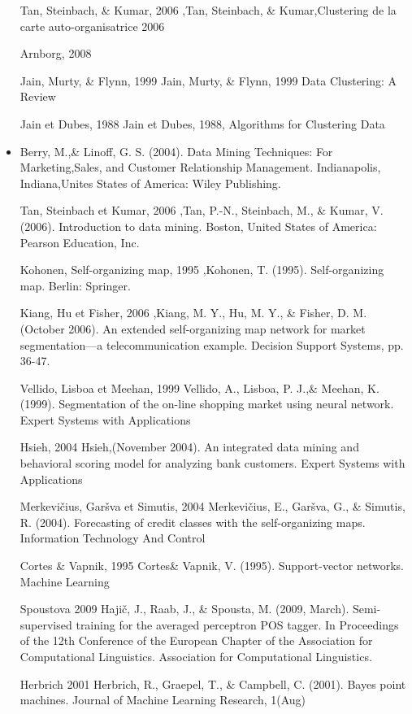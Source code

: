\documentclass[12pt]{article}
\begin{document}
{\begin{itemize}
    \item [Tan, Steinbach, \& Kumar, 2006],Tan, Steinbach, \& Kumar,Clustering de la carte auto-organisatrice 2006
    \item [Arnborg, 2008]
    \item [Jain, Murty, \& Flynn, 1999] Jain, Murty, \& Flynn, 1999 Data Clustering: A Review
    \item [Jain et Dubes, 1988] Jain et Dubes, 1988, Algorithms for Clustering Data
    \item Berry, M.,\& Linoff, G. S. (2004). Data Mining Techniques: For Marketing,Sales, and Customer Relationship Management. Indianapolis, Indiana,Unites States of America: Wiley Publishing.
   \item [Tan, Steinbach et Kumar, 2006],Tan, P.-N., Steinbach, M., \& Kumar, V. (2006). Introduction to data mining. Boston, United States of America: Pearson Education, Inc.
   \item [Kohonen, Self-organizing map, 1995],Kohonen, T. (1995). Self-organizing map. Berlin: Springer.
   \item [Kiang, Hu et Fisher, 2006],Kiang, M. Y., Hu, M. Y., \& Fisher, D. M. (October 2006). An extended self-organizing map network for market segmentation—a telecommunication example. Decision Support Systems, pp. 36-47.
   \item [ Vellido, Lisboa et Meehan, 1999] Vellido, A., Lisboa, P. J.,\& Meehan, K. (1999). Segmentation of the on-line
shopping market using neural network. Expert Systems with Applications
   \item [Hsieh, 2004] Hsieh,(November 2004). An integrated data mining and behavioral scoring model for analyzing bank customers. Expert Systems with
Applications 
    \item [Merkevičius, Garšva et Simutis, 2004] Merkevičius, E., Garšva, G., \& Simutis, R. (2004). Forecasting of credit classes with the self-organizing maps. Information Technology And Control
     \item [Cortes \& Vapnik, 1995] Cortes\& Vapnik, V. (1995). Support-vector networks. Machine Learning
     \item [Spoustova 2009] Hajič, J., Raab, J., \& Spousta, M. (2009, March). Semi-supervised training for the averaged perceptron POS tagger. In Proceedings of the 12th Conference of the European Chapter of the Association for Computational Linguistics. Association for Computational Linguistics.
     \item [Herbrich 2001]Herbrich, R., Graepel, T., \& Campbell, C. (2001). Bayes point machines. Journal of Machine Learning Research, 1(Aug)

\end{itemize}}
\end{document}
